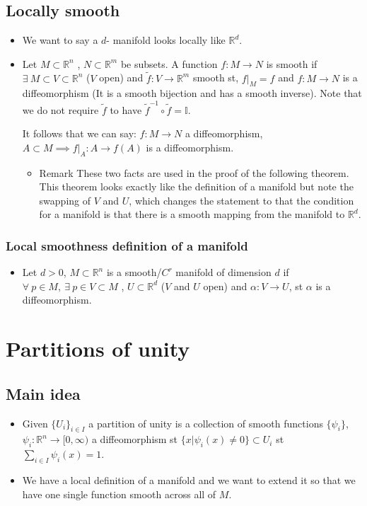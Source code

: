 \documentclass[11pt]{article}
\DeclareRobustCommand{\RR}{\mathbb{R}}
\numberwithin{equation}{section}
\begin{document}
\subsection{Locally smooth}
\begin{itemize}
    \item We want to say a $d$- manifold looks locally like $\RR^d$. 

\item Let $M\subset \RR^n$ , $N\subset \RR^m$ be subsets. A function $f:M \rightarrow N $ is smooth if $\exists ~ M \subset V \subset \RR^n$ ($V$ open) and $\tilde{f}: V \rightarrow \RR^m$ smooth st,  $f\vert_M=f$ and $f:M \rightarrow N$ is a diffeomorphism (It is a smooth bijection and has a smooth inverse). Note that we do not require $\tilde{f} $ to have $\tilde{f}^{-1} \circ \tilde{f} = \mathbb{I} $.  

It follows that we can say: $f:M \rightarrow N$ a diffeomorphism, $A \subset M  \implies f\vert_A: A \rightarrow f(A)$ is a diffeomorphism.

\begin{itemize}  
    \item Remark These two facts are used in the proof of the following theorem. This theorem looks exactly like the definition of a manifold but note the swapping of $V$ and $U$, which changes the statement to that the condition for a manifold is that there is a smooth mapping from the manifold to $\RR^d$. 
\end{itemize}
\end{itemize}

\subsubsection{Local smoothness definition of a manifold}
\begin{itemize}
    \item Let $d>0$, $M \subset \RR^n$ is a smooth/$C^r$ manifold of dimension $d$ if $\forall~p \in M,~\exists~ p\in V \subset M$ , $U \subset \RR^d$ ($V$ and $U$ open) and $\alpha: V \rightarrow U$, st $\alpha$ is a diffeomorphism.  
\end{itemize}

\newpage

\section{Partitions of unity}
\subsection{Main idea }
\begin{itemize}
    \item Given $\{U_i\}_{i \in I }$ a partition of unity is a collection of smooth functions $\{ \psi_i\}$, $\psi_i : \RR^n \rightarrow [0,\infty)$ a diffeomorphism st $\{x|\psi_i(x)\neq 0\}\subset U_i$ st $\sum_{i\in I }\psi_i(x)=1$. 

\item We have a local definition of a manifold and we want to extend it so that we have one single function smooth across all of $M$. 
\end{itemize}
\end{document}
